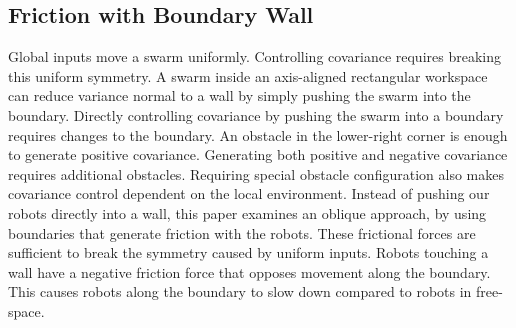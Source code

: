 \subsection{Friction with Boundary Wall}\label{subsec:WallFriction}
Global inputs move a swarm uniformly.  
Controlling covariance requires breaking this uniform symmetry.  A swarm inside an axis-aligned rectangular workspace can reduce variance normal to a wall by simply pushing the swarm into the boundary. Directly controlling covariance by pushing the swarm into a boundary requires changes to the boundary.  An obstacle in the lower-right corner is enough to generate positive covariance.  Generating both positive and negative covariance requires additional obstacles.  Requiring special obstacle configuration also makes covariance control dependent on the local environment. 
  Instead of pushing our robots directly into a wall, this paper examines an oblique approach, by using boundaries that generate friction with the robots.  These frictional forces are  sufficient to break the symmetry caused by uniform inputs.  Robots touching a wall have a negative friction force that opposes movement along the boundary.  This  causes robots along the boundary to slow down compared to robots in free-space. 

